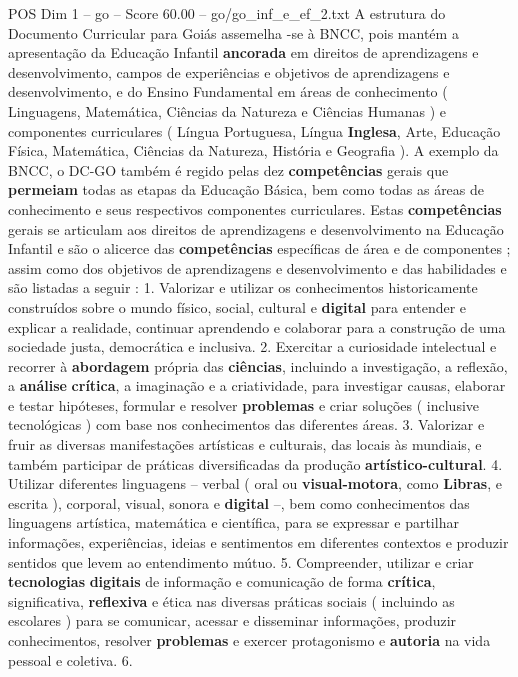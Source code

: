 \begin{textsample}{POS Dim 1 – go – Score 60.00 – go/go\_inf\_e\_ef\_2.txt}
A estrutura do Documento Curricular para Goiás assemelha -se à BNCC, pois mantém a apresentação da Educação Infantil \textbf{ancorada} em direitos de aprendizagens e desenvolvimento, campos de experiências e objetivos de aprendizagens e desenvolvimento, e do Ensino Fundamental em áreas de conhecimento ( Linguagens, Matemática, Ciências da Natureza e Ciências Humanas ) e componentes curriculares ( Língua Portuguesa, Língua \textbf{Inglesa}, Arte, Educação Física, Matemática, Ciências da Natureza, História e Geografia ).
A exemplo da BNCC, o DC-GO também é regido pelas dez \textbf{competências} gerais que \textbf{permeiam} todas as etapas da Educação Básica, bem como todas as áreas de conhecimento e seus respectivos componentes curriculares.
Estas \textbf{competências} gerais se articulam aos direitos de aprendizagens e desenvolvimento na Educação Infantil e são o alicerce das \textbf{competências} específicas de área e de componentes ; assim como dos objetivos de aprendizagens e desenvolvimento e das habilidades e são listadas a seguir : 1.
Valorizar e utilizar os conhecimentos historicamente construídos sobre o mundo físico, social, cultural e \textbf{digital} para entender e explicar a realidade, continuar aprendendo e colaborar para a construção de uma sociedade justa, democrática e inclusiva. 2.
Exercitar a curiosidade intelectual e recorrer à \textbf{abordagem} própria das \textbf{ciências}, incluindo a investigação, a reflexão, a \textbf{análise} \textbf{crítica}, a imaginação e a criatividade, para investigar causas, elaborar e testar hipóteses, formular e resolver \textbf{problemas} e criar soluções ( inclusive tecnológicas ) com base nos conhecimentos das diferentes áreas. 3.
Valorizar e fruir as diversas manifestações artísticas e culturais, das locais às mundiais, e também participar de práticas diversificadas da produção \textbf{artístico-cultural}. 4.
Utilizar diferentes linguagens – verbal ( oral ou \textbf{visual-motora}, como \textbf{Libras}, e escrita ), corporal, visual, sonora e \textbf{digital} –, bem como conhecimentos das linguagens artística, matemática e científica, para se expressar e partilhar informações, experiências, ideias e sentimentos em diferentes contextos e produzir sentidos que levem ao entendimento mútuo. 5.
Compreender, utilizar e criar \textbf{tecnologias} \textbf{digitais} de informação e comunicação de forma \textbf{crítica}, significativa, \textbf{reflexiva} e ética nas diversas práticas sociais ( incluindo as escolares ) para se comunicar, acessar e disseminar informações, produzir conhecimentos, resolver \textbf{problemas} e exercer protagonismo e \textbf{autoria} na vida pessoal e coletiva. 6.

\end{textsample}
